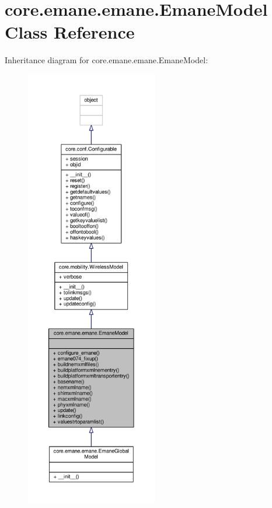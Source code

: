 \hypertarget{classcore_1_1emane_1_1emane_1_1_emane_model}{\section{core.\+emane.\+emane.\+Emane\+Model Class Reference}
\label{classcore_1_1emane_1_1emane_1_1_emane_model}
}


Inheritance diagram for core.\+emane.\+emane.\+Emane\+Model\+:
\nopagebreak
\begin{figure}[H]
\begin{center}
\leavevmode
\includegraphics[height=550pt]{classcore_1_1emane_1_1emane_1_1_emane_model__inherit__graph}
\end{center}
\end{figure}


